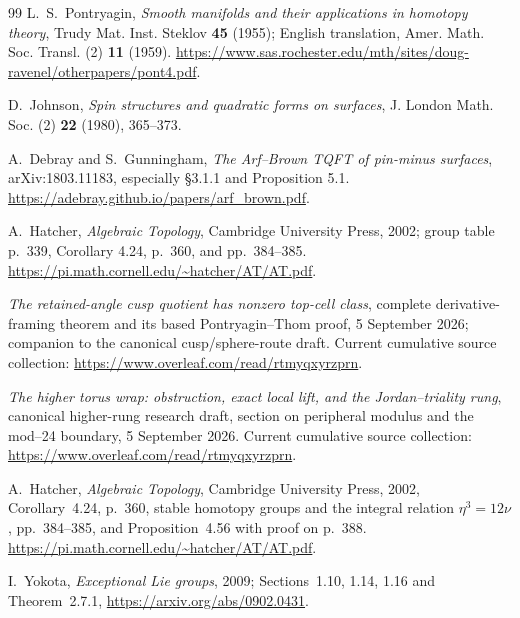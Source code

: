 \documentclass[11pt]{article}
\theoremstyle{definition}
\begin{document}
\begin{thebibliography}{99}
L.~S.~Pontryagin,
\emph{Smooth manifolds and their applications in homotopy theory},
Trudy Mat. Inst. Steklov \textbf{45} (1955);
English translation, Amer. Math. Soc. Transl. (2) \textbf{11} (1959).
\url{https://www.sas.rochester.edu/mth/sites/doug-ravenel/otherpapers/pont4.pdf}.

D.~Johnson, \emph{Spin structures and quadratic forms on surfaces},
J. London Math. Soc. (2) \textbf{22} (1980), 365--373.

A.~Debray and S.~Gunningham,
\emph{The Arf--Brown TQFT of pin-minus surfaces},
arXiv:1803.11183, especially \S3.1.1 and Proposition 5.1.
\url{https://adebray.github.io/papers/arf_brown.pdf}.

A.~Hatcher, \emph{Algebraic Topology}, Cambridge University Press,
2002; group table p.~339, Corollary 4.24, p.~360, and pp.~384--385.
\url{https://pi.math.cornell.edu/~hatcher/AT/AT.pdf}.

\emph{The retained-angle cusp quotient has nonzero top-cell class},
complete derivative-framing theorem and its based
Pontryagin--Thom proof, 5 September 2026;
companion to the canonical cusp/sphere-route draft.
Current cumulative source collection:
\url{https://www.overleaf.com/read/rtmyqxyrzprn}.

\emph{The higher torus wrap: obstruction, exact local lift, and the
Jordan--triality rung},
canonical higher-rung research draft, section on peripheral
modulus and the mod--24 boundary, 5 September 2026.
Current cumulative source collection:
\url{https://www.overleaf.com/read/rtmyqxyrzprn}.

A.~Hatcher, \emph{Algebraic Topology}, Cambridge University Press,
2002, Corollary~4.24, p.~360, stable homotopy groups and the
integral relation \(\eta^3=12\nu\), pp.~384--385,
and Proposition~4.56 with proof on p.~388.
\url{https://pi.math.cornell.edu/~hatcher/AT/AT.pdf}.

I.~Yokota, \emph{Exceptional Lie groups}, 2009;
Sections~1.10, 1.14, 1.16 and Theorem~2.7.1,
\url{https://arxiv.org/abs/0902.0431}.


\end{thebibliography}
\endgroup
\end{document}
